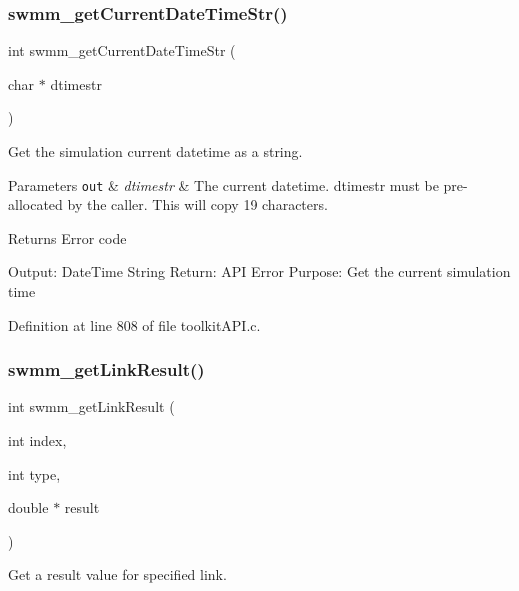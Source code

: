 \subsubsection{\texorpdfstring{swmm\+\_\+get\+Current\+Date\+Time\+Str()}{swmm\_getCurrentDateTimeStr()}}
{\footnotesize\ttfamily int swmm\+\_\+get\+Current\+Date\+Time\+Str (\begin{DoxyParamCaption}\item[{char $\ast$}]{dtimestr }\end{DoxyParamCaption})}



Get the simulation current datetime as a string. 


\begin{DoxyParams}[1]{Parameters}
\mbox{\tt out}  & {\em dtimestr} & The current datetime. dtimestr must be pre-\/allocated by the caller. This will copy 19 characters. \\
\hline
\end{DoxyParams}
\begin{DoxyReturn}{Returns}
Error code
\end{DoxyReturn}
Output\+: Date\+Time String Return\+: A\+PI Error Purpose\+: Get the current simulation time 

Definition at line 808 of file toolkit\+A\+P\+I.\+c.

\mbox{\label{group__tkfuncs_ga578a49668d519c8b4cdcab2227f8119b}} 
\subsubsection{\texorpdfstring{swmm\+\_\+get\+Link\+Result()}{swmm\_getLinkResult()}}
{\footnotesize\ttfamily int swmm\+\_\+get\+Link\+Result (\begin{DoxyParamCaption}\item[{int}]{index,  }\item[{int}]{type,  }\item[{double $\ast$}]{result }\end{DoxyParamCaption})}



Get a result value for specified link. 


